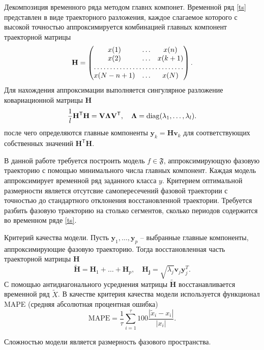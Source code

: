 \documentclass[12pt, twoside]{article}
\begin{document}
Декомпозиция временного ряда методом главнх компонет. Временной ряд \eqref{ts} представлен в виде траекторного разложения, каждое слагаемое которого с высокой точностью аппроксимируется комбинацией главных компонент траекторной матрицы
    \[ \mathbf{H} = \begin{pmatrix}
                        x(1) & \dots & x(n) \\
                        x(2) & \dots & x(k+1) \\
                        \hdotsfor{3} \\
                        x(N-n+1) & \dots & x(N)
                    \end{pmatrix}.\]
Для нахождения аппроксимации выполняется сингулярное разложение ковариационной матрицы $\mathbf{H}$
    \[ \frac{1}{l}\mathbf{H}^{\mathsf{T}}\mathbf{H} = \mathbf{V}\mathbf{\Lambda}\mathbf{V}^{\mathsf{T}}, \quad \mathbf{\Lambda} = \diag(\lambda_1,\dots,\lambda_l). \]
    после чего определяются главные компоненты $\mathbf{y}_k = \mathbf{Hv}_k$ для соответствующих собственных значений $\mathbf{H}^{\mathsf{T}}\mathbf{H}$.

В данной работе требуется построить модель $f\in\mathfrak{F}$, аппроксимирующую фазовую траекторию с помощью минимального числа главных компонент. Каждая модель аппроксимирует временной ряд заданного класса $y$. Критерием оптимальной размерности является отсутсвие самопересечений фазовой траектории с точностью до стандартного отклонения восстановленной траектории. Требуется разбить фазовую траекторию на столько сегментов, сколько периодов содержится во временном ряде \eqref{ts}.
    \begin{figure}[ht]
    \end{figure}

Критерий качества модели. Пусть $\mathbf{y}_1,\dots,\mathbf{y}_p$ -- выбранные главные компоненты, аппроксимирующие фазовую траекторию. Тогда восстановленная часть траекторной матрицы $\mathbf{H}$
    \[ \mathbf{\widetilde{H}} = \mathbf{H}_1  + \dots + \mathbf{H}_p, \quad \mathbf{H_j} = \sqrt{\lambda_j}\mathbf{v}_j\mathbf{y}_j^T.\]
С помощью антидиагонального усреднения матрицы $\mathbf{\tilde{H}}$ восстанавливается временной ряд $\tilde{X}$. В качестве критерия качества модели используется функционал MAPE (средняя абсолютная процентная ошибка)
    \[ \text{MAPE} = \frac{1}{\tau}\sum_{i = 1}^{\tau}100\frac{|\tilde{x}_i - x_i|}{|x_i|}. \]
    
Сложностью модели является размерность фазового пространства.
    \begin{figure}[ht]
    \end{figure}
    
\end{document}
